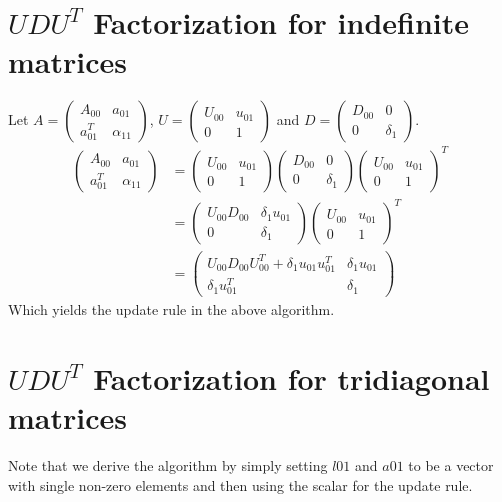 \documentclass[11pt,a4paper]{article}
\begin{document}
\newpage
\section{$UDU^T$ Factorization for indefinite matrices}

\newcommand{\UA}{\left( \begin{array}{cc}
            A_{00} & a_{01}  \\
            a_{01}^T & \alpha_{11} 
        \end{array} \right)}
\newcommand{\UU}{\left( \begin{array}{cc}
            U_{00} & u_{01}  \\
            0 & 1 
        \end{array} \right)}
\newcommand{\DD}{\left(\begin{array}{cc}
            D_{00} & 0  \\
            0 & \delta_{1}
        \end{array} \right)}
Let $A = \UA$, $U = \UU$ and $D = \DD$.
\begin{align}
    \UA &= \UU \DD \UU^T \\
    &= \left(\begin{array}{cc}
            U_{00} D_{00} & \delta_{1} u_{01}  \\
            0 & \delta_{1}
        \end{array} \right) \UU^T \\
    &= \left(\begin{array}{cc}
            U_{00} D_{00} U_{00}^T + \delta_{1} u_{01} u_{01}^T & \delta_{1} u_{01}  \\
            \delta_1 u_{01}^T & \delta_{1}
        \end{array} \right)  
\end{align}
Which yields the update rule in the above algorithm.

\newpage
\section{$UDU^T$ Factorization for tridiagonal matrices}

Note that we derive the algorithm by simply setting $l01$ and $a01$ to be a
vector with single non-zero elements and then using the scalar for the update
rule.

\newpage
\end{document}
